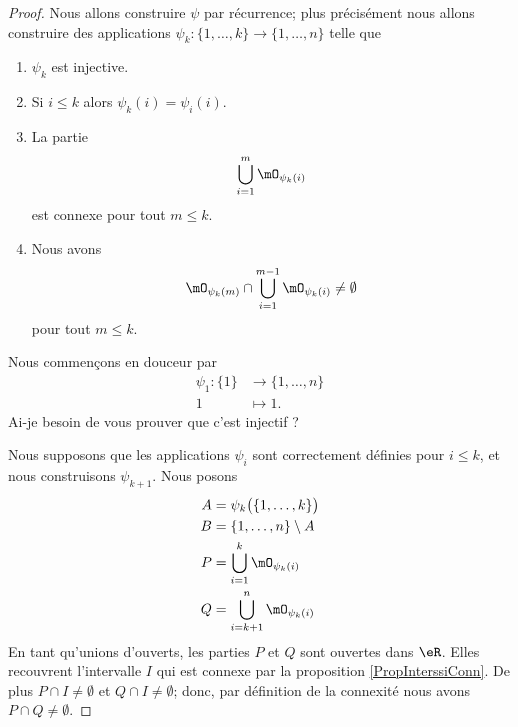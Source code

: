 \begin{proof}
	Nous allons construire \( \psi\) par récurrence; plus précisément nous allons construire des applications \( \psi_k\colon \{ 1,\ldots, k \}\to \{ 1,\ldots, n \}\) telle que
	\begin{enumerate}
		\item
		      \( \psi_k\) est injective.
		\item
		      Si \( i\leq k\) alors \( \psi_k(i)=\psi_i(i)\).
		\item
		      La partie
		      \begin{equation}        \label{EQooAMAGooDHHvGR}
			      \bigcup_{i=1}^m\mO_{\psi_k(i)}
		      \end{equation}
		      est connexe pour tout \( m\leq k\).
		\item
		      Nous avons
		      \begin{equation}        \label{EQooOOZUooKVlDPi}
			      \mO_{\psi_k(m)}\cap\bigcup_{i=1}^{m-1}\mO_{\psi_k(i)}\neq \emptyset
		      \end{equation}
		      pour tout \( m\leq k\).
	\end{enumerate}

	Nous commençons en douceur par
	\begin{equation}
		\begin{aligned}
			\psi_1\colon \{ 1 \} & \to \{ 1,\ldots, n \} \\
			1                    & \mapsto 1.
		\end{aligned}
	\end{equation}
	Ai-je besoin de vous prouver que c'est injectif ?

	Nous supposons que les applications \( \psi_i\) sont correctement définies pour \( i\leq k\), et nous construisons \( \psi_{k+1}\). Nous posons
	\begin{subequations}
		\begin{align}
			A & =\psi_k\big( \{ 1,\ldots, k \} \big) \\
			B & =\{ 1,\ldots, n \}\setminus A        \\
			P & =\bigcup_{i=1}^k\mO_{\psi_k(i)}      \\
			Q & =\bigcup_{i=k+1}^n\mO_{\psi_k(i)}
		\end{align}
	\end{subequations}
	En tant qu'unions d'ouverts, les parties \( P\) et \( Q\) sont ouvertes dans \( \eR\). Elles recouvrent l'intervalle \( I\) qui est connexe par la proposition \ref{PropInterssiConn}. De plus \( P\cap I\neq \emptyset\) et \( Q\cap I\neq \emptyset\); donc, par définition de la connexité nous avons \( P\cap Q\neq\emptyset\).


\end{proof}
